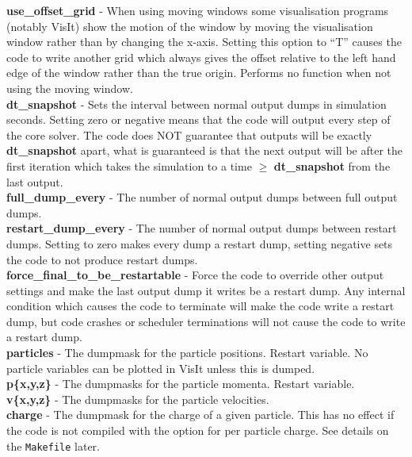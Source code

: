 \documentclass[12pt,a4paper]{article}
\newcommand{\emphtext}{\color{warwickdark} \fontfamily{phv}\selectfont\large\bf}
\newcommand{\code}[1]{{\texttt{#1}}}
\newcommand{\inlineemph}[1]{{\color{warwicklight} \bf{#1}}}
\begin{document}
{\emphtext use\_offset\_grid} - When using moving windows some visualisation
programs (notably VisIt) show the motion of the window by moving the
visualisation window rather than by changing the x-axis. Setting this option to
``T'' causes the code to write another grid which always gives the offset
relative to the left hand edge of the window rather than the true origin.
Performs no function when not using the moving window.\\

{\emphtext dt\_snapshot} - Sets the interval between normal output dumps in
simulation seconds. Setting zero or negative means that the code will output
every step of the core solver. The code does NOT guarantee that outputs will be
exactly \inlineemph{dt\_snapshot} apart, what is guaranteed is that the next
output will be after the first iteration which takes the simulation to a time
$\ge$ \inlineemph{dt\_snapshot} from the last output.\\

{\emphtext full\_dump\_every} - The number of normal output dumps between full
output dumps.\\

{\emphtext restart\_dump\_every} - The number of normal output dumps between
restart dumps. Setting to zero makes every dump a restart dump, setting
negative sets the code to not produce restart dumps.\\

{\emphtext force\_final\_to\_be\_restartable} - Force the code to override
other output settings and make the last output dump it writes be a restart
dump. Any internal condition which causes the code to terminate will make the
code write a restart dump, but code crashes or scheduler terminations will not
cause the code to write a restart dump.\\

{\emphtext particles} - The dumpmask for the particle positions. Restart
variable. No particle variables can be plotted in VisIt unless this is
dumped.\\

{\emphtext p\{x,y,z\}} - The dumpmasks for the particle momenta. Restart
variable.\\

{\emphtext v\{x,y,z\}} - The dumpmasks for the particle velocities.\\

{\emphtext charge} - The dumpmask for the charge of a given particle. This
has no effect if the code is not compiled with the option for per particle
charge. See details on the \code{Makefile} later.\\
\end{document}
